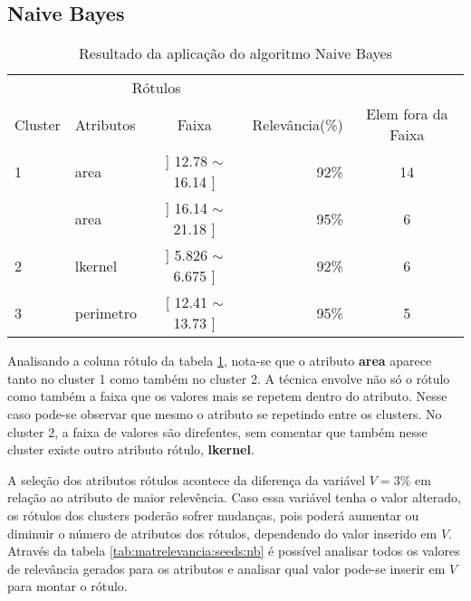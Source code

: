 \subsection{Naive Bayes}
\begin{table}[!h]
\centering
\caption{Resultado da aplicação do algoritmo Naive Bayes}
\label{tab:rot:seeds:nb}
\begin{tabular}{llcrc}
\hline  \hline
\multicolumn{1}{c}{\cellcolor[HTML]{FFFFFF}} & \multicolumn{2}{c}{Rótulos}                & \multicolumn{1}{r}{}               & \\ \cline{2-3}
Cluster                                      & Atributos      & \multicolumn{1}{c}{Faixa} & \multicolumn{1}{c}{Relevância(\%)} & Elem fora da Faixa\\ \hline \hline
1                                            & area           & ] 12.78 $\sim$  16.14 ]   & 92\%                               & 14\\  \hline
                                             & area           & ] 16.14 $\sim$  21.18 ]   & 95\%                               & 6\\ 
\multirow{-2}{*}{2}                          & lkernel        & ] 5.826 $\sim$  6.675 ]   & 92\%                               & 6\\  \hline
3                                            & perimetro      & [ 12.41 $\sim$  13.73 ]   & 95\%                               & 5\\ \hline \hline
\end{tabular}
\end{table}



Analisando a coluna rótulo da tabela \ref{tab:rot:seeds:nb}, nota-se que o atributo \textbf{area} aparece tanto no  cluster 1 como também no cluster 2. A técnica envolve não só o rótulo como também a faixa que os valores mais se repetem dentro do atributo. Nesse caso pode-se observar que mesmo o atributo se repetindo entre os clusters. No cluster 2, a faixa de valores são direfentes, sem comentar que também nesse cluster existe outro atributo rótulo, \textbf{lkernel}.

A seleção dos atributos rótulos acontece da diferença da variável ${V=3\%}$ em relação ao atributo de maior relevência. Caso essa variável tenha o valor alterado, os rótulos dos clusters poderão sofrer mudanças, pois poderá aumentar  ou diminuir o número de atributos dos rótulos, dependendo do valor inserido em ${V}$. Através da tabela \ref{tab:matrelevancia:seeds:nb} é possível analisar todos os valores de relevância gerados para os atributos e analisar qual valor pode-se inserir em ${V}$ para montar o rótulo.


